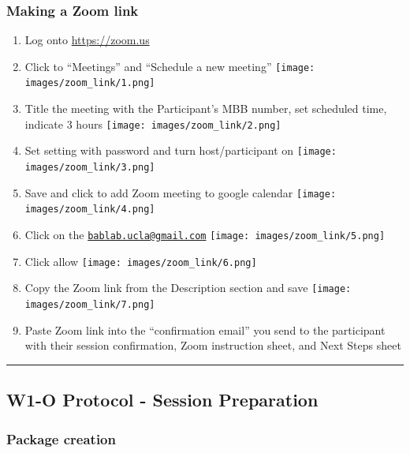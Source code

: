 \documentclass[
]{book}
\providecommand{\tightlist}{%
  \setlength{\itemsep}{0pt}\setlength{\parskip}{0pt}}
\begin{document}
\hypertarget{making-a-zoom-link}{%
\subsubsection{Making a Zoom link}\label{making-a-zoom-link}}

\begin{enumerate}
\def\labelenumi{\arabic{enumi}.}
\tightlist
\item
  Log onto \url{https://zoom.us}
\item
  Click to ``Meetings'' and ``Schedule a new meeting'' \texttt{[image: images/zoom\_link/1.png]}
\item
  Title the meeting with the Participant's MBB number, set scheduled time, indicate 3 hours \texttt{[image: images/zoom\_link/2.png]}
\item
  Set setting with password and turn host/participant on \texttt{[image: images/zoom\_link/3.png]}
\item
  Save and click to add Zoom meeting to google calendar \texttt{[image: images/zoom\_link/4.png]}
\item
  Click on the \href{mailto:bablab.ucla@gmail.com}{\nolinkurl{bablab.ucla@gmail.com}} \texttt{[image: images/zoom\_link/5.png]}
\item
  Click allow \texttt{[image: images/zoom\_link/6.png]}
\item
  Copy the Zoom link from the Description section and save \texttt{[image: images/zoom\_link/7.png]}
\item
  Paste Zoom link into the ``confirmation email'' you send to the participant with their session confirmation, Zoom instruction sheet, and Next Steps sheet
\end{enumerate}

\begin{center}\rule{0.5\linewidth}{0.5pt}\end{center}

\hypertarget{w1-o-protocol---session-preparation}{%
\subsection{W1-O Protocol - Session Preparation}\label{w1-o-protocol---session-preparation}}

\hypertarget{package-creation}{%
\subsubsection{Package creation}\label{package-creation}}
\end{document}
